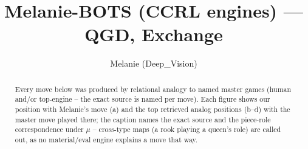 \documentclass[11pt]{article}
\title{Melanie-BOTS (CCRL engines) — QGD, Exchange}
\author{Melanie (Deep\_Vision)}
\date{}
\begin{document}
\maketitle

\begin{abstract}Every move below was produced by relational analogy to named master games (human and/or top-engine -- the exact source is named per move). Each figure shows our position with Melanie's move (a) and the top retrieved analog positions (b--d) with the master move played there; the caption names the exact source and the piece-role correspondence under $\mu$ -- cross-type maps (a rook playing a queen's role) are called out, as no material/eval engine explains a move that way.\end{abstract}

\begin{figure}[p]\centering
\begin{subfigure}{0.46\textwidth}\centering
\resizebox{\linewidth}{!}{%
\newchessgame
\chessboard[
  setfen={rnbqk2r/pp2bppp/2p2n2/3p2B1/3P4/2N1P3/PP3PPP/R2QKBNR w KQkq - 0 7},
  showmover=false,
  pgfstyle=straightmove, color=movearrow, markmove={d1-c2}
]}
\caption{}
\end{subfigure}\hfill
\begin{subfigure}{0.46\textwidth}\centering
\resizebox{\linewidth}{!}{%
\newchessgame
\chessboard[
  setfen={rnbqk2r/pp2bppp/2p2n2/3p2B1/3P4/2N1P3/PP3PPP/R2QKBNR w KQkq - 0 7},
  showmover=false,
  pgfstyle=straightmove, color=movearrow, markmove={d1-c2}
]}
\caption{}
\end{subfigure}
\\[4pt]
\begin{subfigure}{0.46\textwidth}\centering
\resizebox{\linewidth}{!}{%
\newchessgame
\chessboard[
  setfen={rnbqk2r/pp2bppp/2p2n2/3p2B1/3P4/2N1P3/PP3PPP/R2QKBNR w KQkq - 0 7},
  showmover=false,
  pgfstyle=straightmove, color=movearrow, markmove={d1-c2}
]}
\caption{}
\end{subfigure}\hfill
\begin{subfigure}{0.46\textwidth}\centering
\resizebox{\linewidth}{!}{%
\newchessgame
\chessboard[
  setfen={rnbqk2r/pp2bppp/2p2n2/3p2B1/3P4/2N1P3/PP3PPP/R2QKBNR w KQkq - 0 7},
  showmover=false,
  pgfstyle=straightmove, color=movearrow, markmove={d1-c2}
]}
\caption{}
\end{subfigure}

\end{figure}
\end{document}

